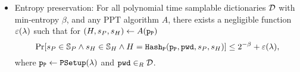 \begin{itemize}
\item Entropy preservation: For all polynomial time samplable dictionaries $\mathcal{D}$ with min-entropy $\beta$, and any PPT algorithm $A$, there exists a negligible function $\varepsilon(\lambda)$ such that for $(H,s_P,s_H)\gets A(\mathtt{p_P})$
\[\Pr[s_P\in\mathbb{S}_P \wedge s_H\in\mathbb{S}_H \wedge H=\mathtt{Hash_P}(\mathtt{p_P},\mathtt{pwd},s_P,s_H)] \leq 2^{-\beta} + \varepsilon(\lambda),\]
where $\mathtt{p_P}\gets\mathtt{PSetup}(\lambda)$ and $\mathtt{pwd}\in_R\mathcal{D}$.
\end{itemize}





%


